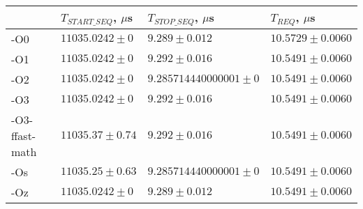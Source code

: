 \begin{tabular}{llll}
\toprule
 & $T_{START\_SEQ}$, $\mu$s & $T_{STOP\_SEQ}$, $\mu$s & $T_{REQ}$, $\mu$s \\
\midrule
-O0 & $11035.0242 \pm 0$ & $9.289 \pm 0.012$ & $10.5729 \pm 0.0060$ \\
-O1 & $11035.0242 \pm 0$ & $9.292 \pm 0.016$ & $10.5491 \pm 0.0060$ \\
-O2 & $11035.0242 \pm 0$ & $9.285714440000001 \pm 0$ & $10.5491 \pm 0.0060$ \\
-O3 & $11035.0242 \pm 0$ & $9.292 \pm 0.016$ & $10.5491 \pm 0.0060$ \\
-O3-ffast-math & $11035.37 \pm 0.74$ & $9.292 \pm 0.016$ & $10.5491 \pm 0.0060$ \\
-Os & $11035.25 \pm 0.63$ & $9.285714440000001 \pm 0$ & $10.5491 \pm 0.0060$ \\
-Oz & $11035.0242 \pm 0$ & $9.289 \pm 0.012$ & $10.5491 \pm 0.0060$ \\
\bottomrule
\end{tabular}
